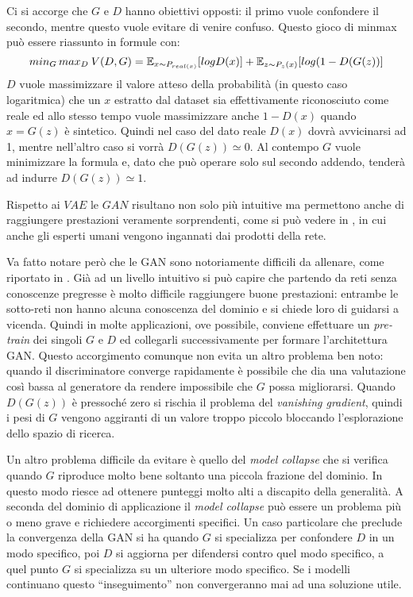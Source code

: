 Ci si accorge che $G$ e $D$ hanno obiettivi opposti: il primo vuole confondere il secondo, mentre questo vuole evitare di venire confuso.
Questo gioco di minmax può essere riassunto in  formule con:
$$
min_G \, max_D \: V(D,G) = \mathbb{E}_{x \sim P_{real(x)}} [ log D(x) ] 
+
\mathbb{E}_{z \sim P_z(x)} [ log ( 1 - D(G(z)) ]
$$
$D$ vuole massimizzare il valore atteso della probabilità (in questo caso logaritmica) che un $x$ estratto dal dataset sia effettivamente riconosciuto come reale ed allo stesso tempo vuole massimizzare anche $ 1 - D(x)$ quando $x=G(z)$ è sintetico.
Quindi nel caso del dato reale $D(x)$ dovrà avvicinarsi ad 1, mentre nell'altro caso si vorrà $D(G(z)) \simeq 0$.
Al contempo $G$ vuole minimizzare la formula e, dato che può operare solo sul secondo addendo, tenderà ad indurre $D(G(z)) \simeq 1$.

Rispetto ai $VAE$ le $GAN$ risultano non solo più intuitive ma permettono anche di raggiungere prestazioni veramente sorprendenti, come si può vedere in \cite{GAN_HD}, in cui anche gli esperti umani vengono ingannati dai prodotti della rete.

Va fatto notare però che le GAN sono notoriamente difficili da allenare, come riportato in \cite{HARD_GAN}.
Già ad un livello intuitivo si può capire che partendo da reti senza conoscenze pregresse è molto difficile raggiungere buone prestazioni: entrambe le sotto-reti non hanno alcuna conoscenza del dominio e si chiede loro di guidarsi a vicenda.
Quindi in molte applicazioni, ove possibile, conviene effettuare un \emph{pre-train} dei singoli $G$ e $D$ ed collegarli successivamente per formare l'architettura GAN.
Questo accorgimento comunque non evita un altro problema ben noto: quando il discriminatore converge rapidamente è possibile che dia una valutazione così bassa al generatore da rendere impossibile che $G$ possa migliorarsi.
Quando $D(G(z))$ è pressoché zero si rischia il problema del \emph{vanishing gradient}, quindi i pesi di $G$ vengono aggiranti di un valore troppo piccolo bloccando l'esplorazione dello spazio di ricerca.

Un altro problema difficile da evitare è quello del \emph{model collapse} che si verifica quando $G$ riproduce molto bene soltanto una piccola frazione del dominio.
In questo modo riesce ad ottenere punteggi molto alti a discapito della generalità.
A seconda del dominio di applicazione il \emph{model collapse} può essere un problema più o meno grave e richiedere accorgimenti specifici.
Un caso particolare che preclude la convergenza della GAN si ha quando $G$ si specializza per confondere $D$ in un modo specifico, poi $D$ si aggiorna per difendersi contro quel modo specifico, a quel punto $G$ si specializza su un ulteriore modo specifico.
Se i modelli continuano questo ``inseguimento'' non convergeranno mai ad una soluzione utile.

